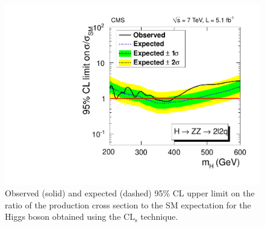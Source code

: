 
\begin{figure}[htbp]
\begin{center}
\includegraphics[width=0.6\linewidth]{figures/ZZ2l2qLimit.pdf}
\caption{
Observed (solid) and expected (dashed) 95\% CL upper limit
on the ratio of the production cross section to the SM expectation
for the Higgs boson obtained using the $\mathrm{CL_s}$ technique.
}
\label{fig:ZZ2l2qlimit}
\end{center}
\end{figure}



